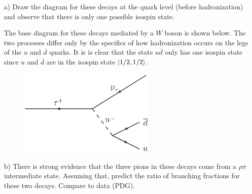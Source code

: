 
a) Draw the diagram for these decays at the quark level (before hadronization) and observe that there is only one possible isospin state.

The base diagram for these decays mediated by a $W$ boson is shown below.
The two processes differ only by the specifics of how hadronization occurs on the legs of the $u$ and $\overline{d}$ quarks.
It is is clear that the state $u\overline{d}$ only has one isospin state since $u$ and $\overline{d}$ are in the isospin state $\ket{1/2,1/2}$.

\begin{figure}[H]
\begin{center}
\includegraphics[width=0.6\textwidth]{prob4.eps}
\end{center} 
\end{figure}

b) There is strong evidence that the three pions in these decays come from a $\rho \pi$ intermediate state.
Assuming that, predict the ratio of branching fractions for these two decays.
Compare to data (PDG).

